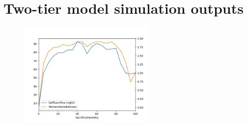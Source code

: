 \documentclass[a4paper,12pt]{report}
\begin{document}














\section{Two-tier model simulation outputs}



















\begin{figure}[h]
    \centering
    \includegraphics[width=0.6\textwidth]{Hered_a50}
    \caption{}
    \label{fig:h}
    \end{figure}
\end{document}
